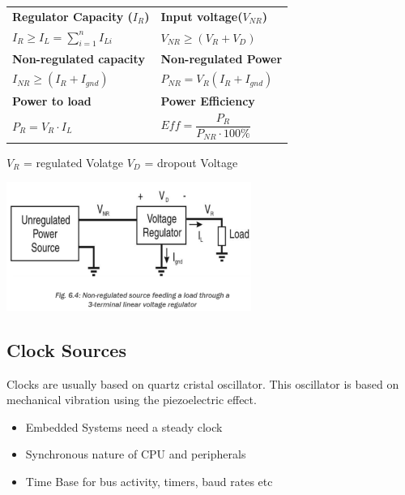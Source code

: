\begin{tabular}{l l}
    \textbf{Regulator Capacity ($I_R$)}     & \textbf{Input voltage($V_{NR}$)} \\
    $ I_R \geq I_L = \sum_{i=1}^{n}I_{Li} $ & $ V_{NR} \geq  (V_R + V_D)$\\
    \textbf{Non-regulated capacity}         & \textbf{Non-regulated Power} \\
    $ I_{NR} \geq (I_R + I_{gnd}) $         & $ P_{NR}=V_R(I_R + I_{gnd}) $ \\
    \textbf{Power to load}                  & \textbf{Power Efficiency} \\
    $ P_R = V_R \cdot I_L $                 & $ Eff = \dfrac{P_R}{P_{NR}\cdot 100\%} $\\   
\end{tabular}
\begin{minipage}{2cm}
    {\scriptsize
    $V_R$ = regulated Volatge\newline
    $ V_D$ = dropout Voltage \newline  } 
\end{minipage}
\begin{minipage}{5cm}
    \includegraphics[width=8cm]{images/NRPowerSource.png}
\end{minipage}

\clearpage

\subsection{Clock Sources }
Clocks are usually based on quartz cristal oscillator. This oscillator is based on mechanical vibration using the piezoelectric effect. 
\begin{itemize}
	\item Embedded Systems need a steady clock
	\item Synchronous nature of CPU and peripherals
	\item Time Base for bus activity, timers, baud rates etc
\end{itemize}
